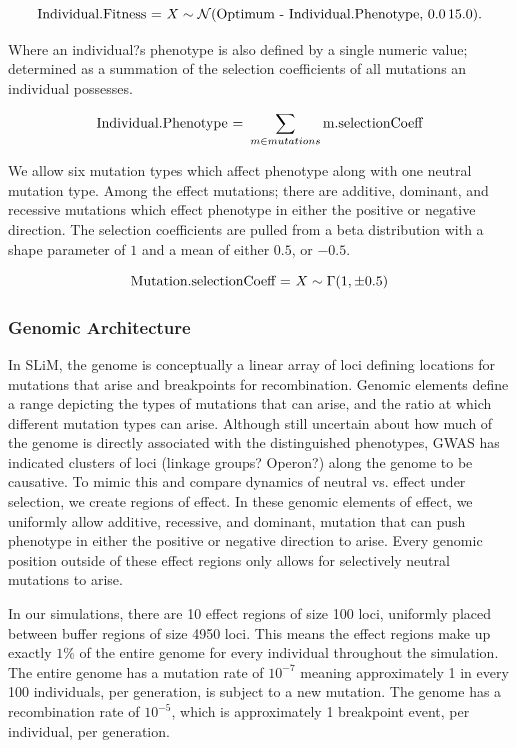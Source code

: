 \documentclass{article}
\begin{document}
    \[
\textnormal{Individual.Fitness = } X \sim \mathcal{N}(\textnormal{Optimum - Individual.Phenotype},\,0.0\,15.0).
    \]

Where an individual?s phenotype is also defined by a single numeric value; 
determined as a summation of the selection coefficients of all mutations an individual possesses. 

	\[
{\textnormal{Individual.Phenotype = } \sum_{m \in mutations} \textnormal{m.selectionCoeff}}
	\]
    
    
We allow six mutation types which affect phenotype along with one neutral mutation type.
Among the effect mutations; 
there are additive, dominant, and recessive mutations which effect phenotype
in either the positive or negative direction. 
The selection coefficients are pulled from a beta distribution 
with a shape parameter of $1$ and a mean of either $0.5$, or ${-0.5}$. 

	\[
\textnormal{Mutation.selectionCoeff = } X \sim \Gamma (1,\pm0.5)
	\]


\subsubsection*{Genomic Architecture}

In SLiM, the genome is conceptually a linear array of loci defining locations for 
mutations that arise and breakpoints for recombination. 
Genomic elements define a range depicting the types of mutations that can arise, and the ratio at which different mutation types can arise. 
Although still uncertain about how much of the genome is directly associated with the distinguished phenotypes, 
GWAS has indicated clusters of loci (linkage groups? Operon?) along the genome to be causative. 
To mimic this and compare dynamics of neutral vs. effect under selection, 
we create regions of effect. 
In these genomic elements of effect, we uniformly allow additive, recessive, and dominant, mutation that can push phenotype in either the positive or negative direction to arise. 
Every genomic position outside of these effect regions only allows for selectively neutral mutations to arise.

In our simulations, there are 10 effect regions of size 100 loci, uniformly placed between buffer regions of size 4950 loci. 
This means the effect regions make up exactly $1\%$ of the entire genome for every individual throughout the simulation. 
The entire genome has a mutation rate of $10^{-7}$ meaning approximately 1 in every 100 individuals, per generation, is subject to a new mutation. 
The genome has a recombination rate of $10^{-5}$, which is approximately 1 breakpoint event, per individual, per generation. 
\end{document}
